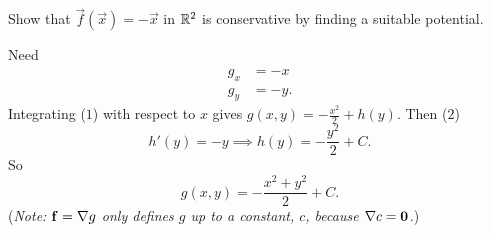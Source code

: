 \documentclass[10pt, a4paper]{article}
\begin{document}
\begin{example}
    Show that $\vec{f}(\vec{x}) = -\vec{x}$ in $\mathbb{R} ^ 2$ is conservative by finding a suitable potential.

    \begin{solution}
        Need 
        \begin{align}
            g_x &= -x \\
            g_y &= -y.
        \end{align}
        Integrating
        ($1$)
        with respect to $x$ gives $g(x, y) = -\frac{x ^ 2}{2} + h(y)$.
        Then
        ($2$)
        \[
        h'(y) = -y \implies h(y) = -\frac{y ^ 2}{2} + C.
        \]
        So
        \[
        g(x, y) = -\frac{x ^ 2 + y ^ 2}{2} + C.
        \]
        (\textit{Note:
        $\mathbf{f} = \mathbf{\nabla} g$ only defines $g$ up to a constant,
        $c$,
        because $\mathbf{\nabla} c = \mathbf{0}$.})
    \end{solution}
\end{example}
\end{document}
